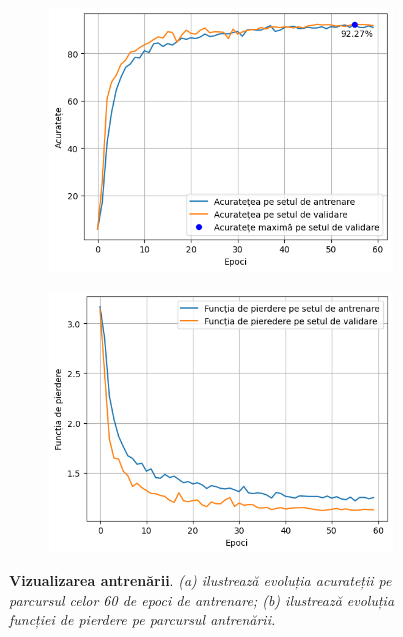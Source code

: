 \begin{figure}[H]
  \centering
  \begin{subfigure}{0.49\textwidth}
    \includegraphics[width=\linewidth]{images/2-recunoasterea-asl/train_val_accs.png}
    \caption{}
    \label{fig:train_val_acc}
  \end{subfigure}
  \begin{subfigure}{0.49\textwidth}
    \includegraphics[width=\linewidth]{images/2-recunoasterea-asl/train_val_loss.png}
    \caption{}
    \label{fig:train_val_loss}
  \end{subfigure}
  \caption[Vizualizarea antrenării]{\textbf{Vizualizarea antrenării}. \textit{(a) ilustrează evoluția acurateții pe parcursul celor 60 de epoci de antrenare; (b) ilustrează evoluția funcției de pierdere pe parcursul antrenării.}}
  \label{fig:train_val_acc_loss}
\end{figure}




